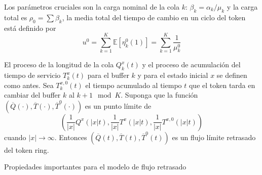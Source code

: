 \documentclass{article}
\newcommand{\esp}{\mathbb{E}}
\begin{document}
Los par\'ametros cruciales son la carga nominal de la cola $k$:
$\beta_{k}=\alpha_{k}/\mu_{k}$ y la carga total es
$\rho_{0}=\sum\beta_{k}$, la media total del tiempo de cambio en
un ciclo del token est\'a definido por
\begin{equation}
 u^{0}=\sum_{k=1}^{K}\esp\left[\eta_{k}^{0}\left(1\right)\right]=\sum_{k=1}^{K}\frac{1}{\mu_{k}^{0}}
\end{equation}

El proceso de la longitud de la cola $Q_{k}^{x}\left(t\right)$ y
el proceso de acumulaci\'on del tiempo de servicio
$T_{k}^{x}\left(t\right)$ para el buffer $k$ y para el estado
inicial $x$ se definen como antes. Sea $T_{k}^{x,0}\left(t\right)$
el tiempo acumulado al tiempo $t$ que el token tarda en cambiar
del buffer $k$ al $k+1\mod K$. Suponga que la funci\'on
$\left(\overline{Q}\left(\cdot\right),\overline{T}\left(\cdot\right),\overline{T}^{0}\left(\cdot\right)\right)$
es un punto l\'imite de
\begin{equation}\label{Eq.4.4}
\left(\frac{1}{|x|}Q^{x}\left(|x|t\right),\frac{1}{|x|}T^{x}\left(|x|t\right),\frac{1}{|x|}T^{x,0}\left(|x|t\right)\right)
\end{equation}
cuando $|x|\rightarrow\infty$. Entonces
$\left(\overline{Q}\left(t\right),\overline{T}\left(t\right),\overline{T}^{0}\left(t\right)\right)$
es un flujo l\'imite retrasado del token ring.

Propiedades importantes para el modelo de flujo retrasado
\end{document}
